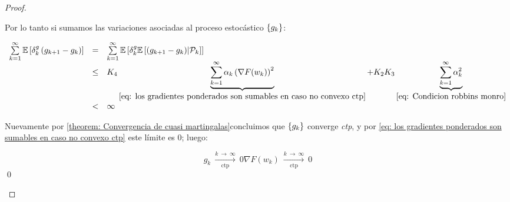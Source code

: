 \begin{proof}
\begin{enumerate}
		 Por lo tanto si sumamos las variaciones asociadas al proceso estoc\'astico $\left\lbrace g_k\right\rbrace$:
		 
		 \begin{equation}
		 \begin{array}{rcl}
		 \sum\limits_{k=1}^{\infty} {\mathbb{E} \left[\delta_k^{g} \left(g_{k+1} - g_k\right)\right]} & = & \sum\limits_{k=1}^{\infty} {\mathbb{E} \left[\delta_k^{g} \mathbb{E} \left[{\left(g_{k+1} - g_k\right)} \vert \mathcal{P}_{k}\right]\right]} \\
		 & \leq & K_4 \underbrace{\sum\limits_{k=1}^{\infty} {\alpha_k \left(\nabla F(w_k)\right)^2}}_{\ref{eq: los gradientes ponderados son sumables en caso no convexo ctp}} + K_2K_3 \underbrace{\sum\limits_{k=1}^{\infty} {\alpha_k^2}}_{\ref{eq: Condicion robbins monro}} \\
		 & < &  \infty
		 \end{array}
		 \end{equation}
		 
		 Nuevamente por \ref{theorem: Convergencia de cuasi martingalas}concluimos que $\left\lbrace g_k\right\rbrace$ converge \textit{ctp}, y por \ref{eq: los gradientes ponderados son sumables en caso no convexo ctp} este l\'imite es $0$; luego:
		 
		 	\begin{subequations}
		 	\begin{equation}
		 	g_k \ \xrightarrow[\text{ctp}]{k \ \rightarrow \ \infty } \ 0
		 	\end{equation}
		 	\begin{equation}
		 	\nabla F(w_k) \ \xrightarrow[\text{ctp}]{k \ \rightarrow \ \infty } \ 0
		 	\end{equation}
		 \end{subequations}
		 \qed
	\end{enumerate}
	
\end{proof}